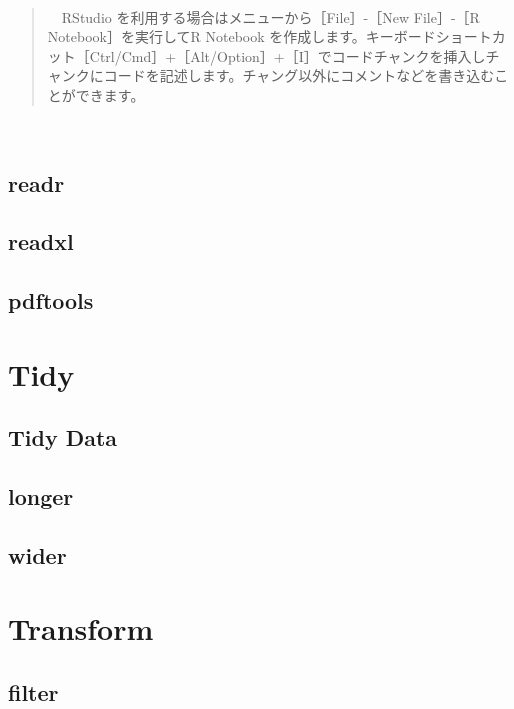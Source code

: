 \documentclass[
  12pt,
]{book}
\begin{document}
　

\begin{quote}
　RStudio を利用する場合はメニューから［File］-［New File］-［R Notebook］を実行してR Notebook を作成します。キーボードショートカット［Ctrl/Cmd］+［Alt/Option］+［I］でコードチャンクを挿入しチャンクにコードを記述します。チャング以外にコメントなどを書き込むことができます。
\end{quote}

　

\hypertarget{readr}{%
\section{readr}\label{readr}}

\hypertarget{readxl}{%
\section{readxl}\label{readxl}}

\hypertarget{pdftools}{%
\section{pdftools}\label{pdftools}}

\hypertarget{tidy-2}{%
\chapter{Tidy}\label{tidy-2}}

\hypertarget{tidy-data}{%
\section{Tidy Data}\label{tidy-data}}

\hypertarget{longer}{%
\section{longer}\label{longer}}

\hypertarget{wider}{%
\section{wider}\label{wider}}

\hypertarget{transform-2}{%
\chapter{Transform}\label{transform-2}}

\hypertarget{filter}{%
\section{filter}\label{filter}}
\end{document}
